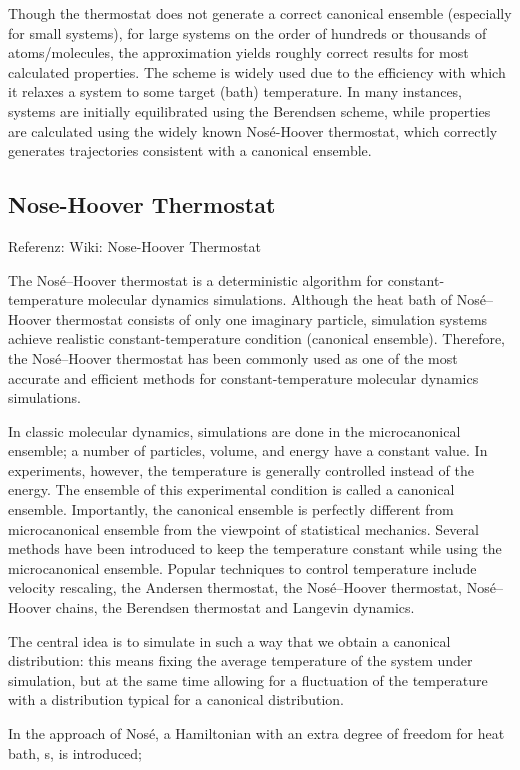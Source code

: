 \documentclass[]{article}
\begin{document}
Though the thermostat does not generate a correct canonical ensemble (especially for small systems), for large systems on the order of hundreds or thousands of atoms/molecules, the approximation yields roughly correct results for most calculated properties. The scheme is widely used due to the efficiency with which it relaxes a system to some target (bath) temperature. In many instances, systems are initially equilibrated using the Berendsen scheme, while properties are calculated using the widely known Nosé-Hoover thermostat, which correctly generates trajectories consistent with a canonical ensemble.

\subsection{Nose-Hoover Thermostat}
Referenz: Wiki: Nose-Hoover Thermostat

The Nosé–Hoover thermostat is a deterministic algorithm for constant-temperature molecular dynamics simulations.
Although the heat bath of Nosé–Hoover thermostat consists of only one imaginary particle, simulation systems achieve realistic constant-temperature condition (canonical ensemble). Therefore, the Nosé–Hoover thermostat has been commonly used as one of the most accurate and efficient methods for constant-temperature molecular dynamics simulations.

In classic molecular dynamics, simulations are done in the microcanonical ensemble; a number of particles, volume, and energy have a constant value. In experiments, however, the temperature is generally controlled instead of the energy. The ensemble of this experimental condition is called a canonical ensemble. Importantly, the canonical ensemble is perfectly different from microcanonical ensemble from the viewpoint of statistical mechanics. Several methods have been introduced to keep the temperature constant while using the microcanonical ensemble. Popular techniques to control temperature include velocity rescaling, the Andersen thermostat, the Nosé–Hoover thermostat, Nosé–Hoover chains, the Berendsen thermostat and Langevin dynamics.

The central idea is to simulate in such a way that we obtain a canonical distribution: this means fixing the average temperature of the system under simulation, but at the same time allowing for a fluctuation of the temperature with a distribution typical for a canonical distribution.

In the approach of Nosé, a Hamiltonian with an extra degree of freedom for heat bath, s, is introduced;
\end{document}

